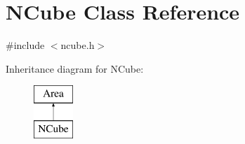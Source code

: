 \hypertarget{class_n_cube}{}\section{N\+Cube Class Reference}
\label{class_n_cube}


{\ttfamily \#include $<$ncube.\+h$>$}

Inheritance diagram for N\+Cube\+:\begin{figure}[H]
\begin{center}
\leavevmode
\includegraphics[height=2.000000cm]{class_n_cube}
\end{center}
\end{figure}
